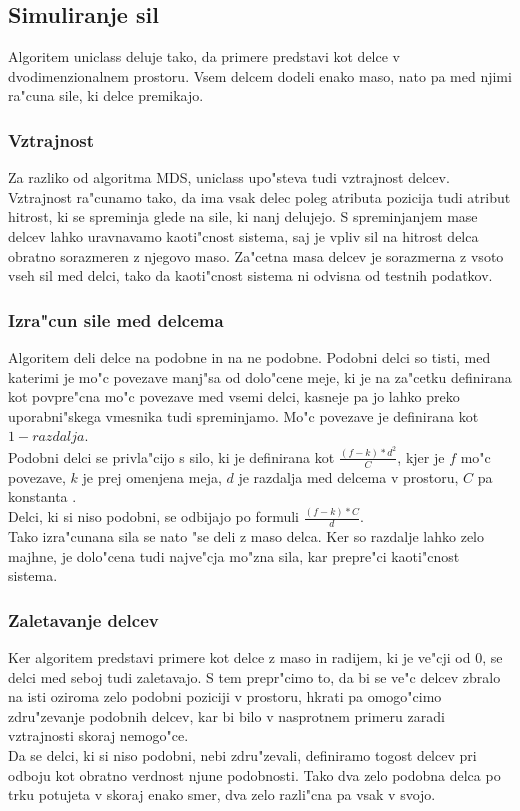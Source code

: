 \documentclass[slovene,11pt]{article}
\begin{document}
	\subsection{Simuliranje sil}
		Algoritem uniclass deluje tako, da primere predstavi kot delce v dvodimenzionalnem prostoru. Vsem delcem dodeli enako maso, nato pa med njimi ra"cuna sile, ki delce premikajo.
		\subsubsection{Vztrajnost}
			Za razliko od algoritma MDS, uniclass upo"steva tudi vztrajnost delcev. Vztrajnost ra"cunamo tako, da ima vsak delec poleg atributa pozicija tudi atribut hitrost, ki se spreminja glede na sile, ki nanj delujejo. S spreminjanjem mase delcev lahko uravnavamo kaoti"cnost sistema, saj je vpliv sil na hitrost delca obratno sorazmeren z njegovo maso. Za"cetna masa delcev je sorazmerna z vsoto vseh sil med delci, tako da kaoti"cnost sistema ni odvisna od testnih podatkov.
		\subsubsection{Izra"cun sile med delcema}
			Algoritem deli delce na podobne in na ne podobne. Podobni delci so tisti, med katerimi je mo"c povezave manj"sa od dolo"cene meje, ki je na za"cetku definirana kot povpre"cna mo"c povezave med vsemi delci, kasneje pa jo lahko preko uporabni"skega vmesnika tudi spreminjamo. Mo"c povezave je definirana kot $ 1 - razdalja $.\\
			Podobni delci se privla"cijo s silo, ki je definirana kot $ \frac{(f - k) * d^2}{C} $, kjer je $f$ mo"c povezave, $k$ je prej omenjena meja, $d$ je razdalja med delcema v prostoru, $C$ pa konstanta . \\
			Delci, ki si niso podobni, se odbijajo po formuli $ \frac{(f - k) * C}{d} $.\\
			Tako izra"cunana sila se nato "se deli z maso delca. Ker so razdalje lahko zelo majhne, je dolo"cena tudi najve"cja mo"zna sila, kar prepre"ci kaoti"cnost sistema.
		\subsubsection{Zaletavanje delcev}
			Ker algoritem predstavi primere kot delce z maso in radijem, ki je ve"cji od 0, se delci med seboj tudi zaletavajo. S tem prepr"cimo to, da bi se ve"c delcev zbralo na isti oziroma zelo podobni poziciji v prostoru, hkrati pa omogo"cimo zdru"zevanje podobnih delcev, kar bi bilo v nasprotnem primeru zaradi vztrajnosti skoraj nemogo"ce.\\
			Da se delci, ki si niso podobni, nebi zdru"zevali, definiramo togost delcev pri odboju kot obratno verdnost njune podobnosti. Tako dva zelo podobna delca po trku potujeta v skoraj enako smer, dva zelo razli"cna pa vsak v svojo.
\end{document}
